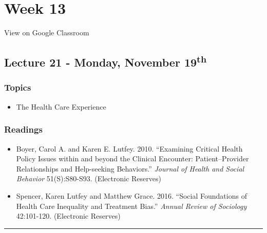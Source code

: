 \documentclass[]{book}
\providecommand{\tightlist}{%
  \setlength{\itemsep}{0pt}\setlength{\parskip}{0pt}}
\theoremstyle{definition}
\theoremstyle{definition}
\theoremstyle{definition}
\theoremstyle{remark}
\begin{document}
\hypertarget{week-13}{%
\section*{Week 13}\label{week-13}}

View on Google Classroom

\hypertarget{lecture-21---monday-november-19th}{%
\subsection*{\texorpdfstring{Lecture 21 - Monday, November
19\textsuperscript{th}}{Lecture 21 - Monday, November 19th}}\label{lecture-21---monday-november-19th}}

\hypertarget{topics-24}{%
\subsubsection*{Topics}\label{topics-24}}

\begin{itemize}
\tightlist
\item
  The Health Care Experience
\end{itemize}

\hypertarget{readings-22}{%
\subsubsection*{Readings}\label{readings-22}}

\begin{itemize}
\tightlist
\item
  Boyer, Carol A. and Karen E. Lutfey. 2010. ``Examining Critical Health
  Policy Issues within and beyond the Clinical Encounter:
  Patient--Provider Relationships and Help-seeking Behaviors.''
  \emph{Journal of Health and Social Behavior} 51(S):S80-S93.
  (Electronic Reserves)
\item
  Spencer, Karen Lutfey and Matthew Grace. 2016. ``Social Foundations of
  Health Care Inequality and Treatment Bias.'' \emph{Annual Review of
  Sociology} 42:101-120. (Electronic Reserves)
\end{itemize}

\begin{center}\rule{0.5\linewidth}{\linethickness}\end{center}
\end{document}
